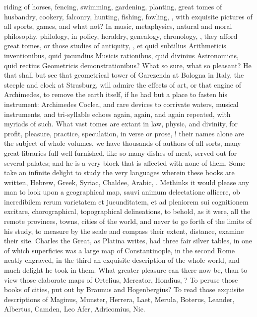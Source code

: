 {riding of horses, fencing, swimming, gardening, planting,
great tomes of husbandry, cookery, falconry, hunting, fishing, fowling,
\etc{}, with exquisite pictures of all sports, games, and what not? In
music, metaphysics, natural and moral philosophy, philology, in policy,
heraldry, genealogy, chronology, \etc{}, they afford great tomes, or those
studies of antiquity, \etc{}, et quid subtilius Arithmeticis
inventionibus, quid jucundius Musicis rationibus, quid divinius
Astronomicis, quid rectius Geometricis demonstrationibus? What so sure,
what so pleasant? He that shall but see that geometrical tower of
Garezenda at Bologna in Italy, the steeple and clock at Strasburg, will
admire the effects of art, or that engine of Archimedes, to remove the
earth itself, if he had but a place to fasten his instrument:
Archimedes Coclea, and rare devices to corrivate waters, musical
instruments, and tri-syllable echoes again, again, and again repeated,
with myriads of such. What vast tomes are extant in law, physic, and
divinity, for profit, pleasure, practice, speculation, in verse or
prose, \etc{}! their names alone are the subject of whole volumes, we have
thousands of authors of all sorts, many great libraries full well
furnished, like so many dishes of meat, served out for several palates;
and he is a very block that is affected with none of them. Some take an
infinite delight to study the very languages wherein these books are
written, Hebrew, Greek, Syriac, Chaldee, Arabic, \etc{}. Methinks it would
please any man to look upon a geographical map, sauvi animum
delectatione allicere, ob incredibilem rerum varietatem et
jucunditatem, et ad pleniorem sui cognitionem excitare, chorographical,
topographical delineations, to behold, as it were, all the remote
provinces, towns, cities of the world, and never to go forth of the
limits of his study, to measure by the seale and compass their extent,
distance, examine their site. Charles the Great, as Platina writes, had
three fair silver tables, in one of which superficies was a large map
of Constantinople, in the second Rome neatly engraved, in the third an
exquisite description of the whole world, and much delight he took in
them. What greater pleasure can there now be, than to view those
elaborate maps of Ortelius, Mercator, Hondius, \etc{}? To peruse
those books of cities, put out by Braunus and Hogenbergius? To read
those exquisite descriptions of Maginus, Munster, Herrera, Laet,
Merula, Boterus, Leander, Albertus, Camden, Leo Afer, Adricomius, Nic.
}
